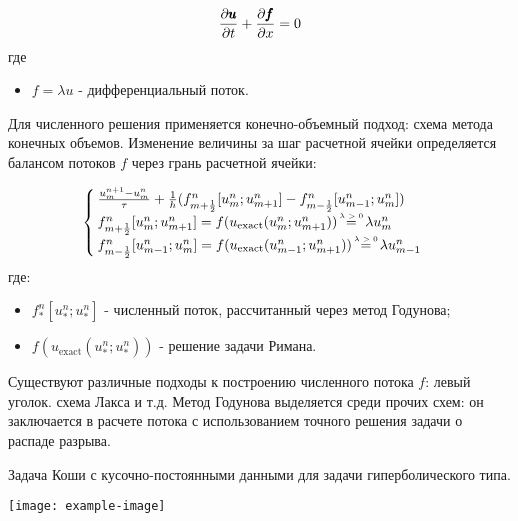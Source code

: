 \begin{equation}
	\frac{\partial \pmb{u}}{\partial t} + \frac{\partial \pmb{f}}{\partial x} = 0\\
\end{equation}
где
\begin{itemize}
	\item $f = \lambda u$ - дифференциальный поток.
\end{itemize}

Для численного решения применяется конечно-объемный подход: схема метода конечных объемов. Изменение величины за шаг расчетной ячейки определяется балансом потоков $f$ через грань расчетной ячейки:

\begin{equation}
	\begin{cases}
		\frac{u^{n+1}_{m} - u^{n}_{m}}{\tau} + \frac{1}{h} (f^{n}_{m+\frac{1}{2}}[u^{n}_{m}; u^{n}_{m+1}] - f^{n}_{m-\frac{1}{2}}[u^{n}_{m-1}; u^{n}_{m}])\\
		f^{n}_{m+\frac{1}{2}}[u^{n}_{m}; u^{n}_{m+1}] = f(u_{\text{exact}}(u^{n}_{m}; u^{n}_{m+1})) \ \lameq \ \lambda u^{n}_{m}\\
		f^{n}_{m-\frac{1}{2}}[u^{n}_{m-1}; u^{n}_{m}] = f(u_{\text{exact}}(u^{n}_{m-1}; u^{n}_{m+1})) \ \lameq \ \lambda u^{n}_{m-1}\\
	\end{cases}
\end{equation}
где:
\begin{itemize}
	\item $f^{n}_{*}[u^{n}_{*}; u^{n}_{*}]$ - численный поток, рассчитанный через метод Годунова;
	\item $f(u_{\text{exact}}(u^{n}_{*}; u^{n}_{*}))$ - решение задачи Римана.
\end{itemize}

Существуют различные подходы к построению численного потока $f$: левый уголок. схема Лакса и т.д. Метод Годунова выделяется среди прочих схем: он заключается в расчете потока с использованием точного решения задачи о распаде разрыва.

\begin{definition}
	Задача Коши с кусочно-постоянными данными для задачи гиперболического типа.
\end{definition}

\begin{example}
	
	\texttt{[image: example-image]}
\end{example}

